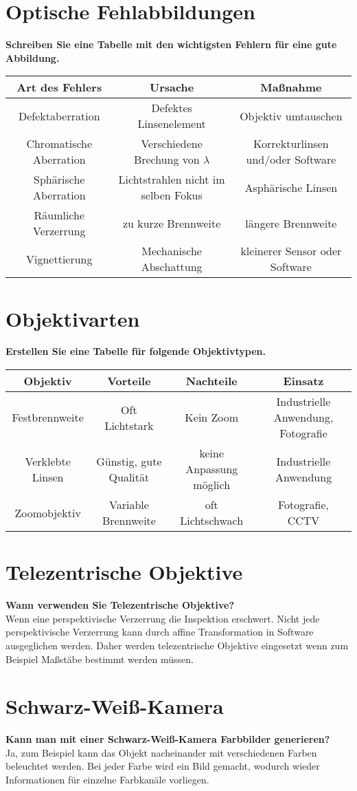 \documentclass[a4paper]{article}
\begin{document}
	\newpage
	
	\section{Optische Fehlabbildungen}
	\textbf{Schreiben Sie eine Tabelle mit den wichtigsten Fehlern für eine gute Abbildung.}\\
		\begin{tabular}{ c|c|c }
			Art des Fehlers & Ursache & Maßnahme \\ 
			\hline
			Defektaberration & Defektes Linsenelement & Objektiv umtauschen \\
			Chromatische Aberration & Verschiedene Brechung von $\lambda$ & Korrekturlinsen und/oder Software\\
			Sphärische Aberration & Lichtstrahlen nicht im selben Fokus & Asphärische Linsen\\
			Räumliche Verzerrung & zu kurze Brennweite & längere Brennweite\\
			Vignettierung & Mechanische Abschattung & kleinerer Sensor oder Software
		\end{tabular}

	
	\section{Objektivarten}
	\textbf{Erstellen Sie eine Tabelle für folgende Objektivtypen.}\\
		\begin{tabular}{ c|c|c|c }
			Objektiv & Vorteile & Nachteile & Einsatz \\ 
			\hline
			Festbrennweite & Oft Lichtstark & Kein Zoom & Industrielle Anwendung, Fotografie\\
			Verklebte Linsen & Günstig, gute Qualität & keine Anpassung möglich & Industrielle Anwendung\\
			Zoomobjektiv & Variable Brennweite & oft Lichtschwach & Fotografie, CCTV
		\end{tabular}
	
	\section{Telezentrische Objektive}
	\textbf{Wann verwenden Sie Telezentrische Objektive?}\\
	Wenn eine perspektivische Verzerrung die Inspektion erschwert. Nicht jede perspektivische Verzerrung kann durch affine Transformation in Software ausgeglichen werden. Daher werden telezentrische Objektive eingesetzt wenn zum Beispiel Maßstäbe bestimmt werden müssen.\\
	
	\section{Schwarz-Weiß-Kamera}
	\textbf{Kann man mit einer Schwarz-Weiß-Kamera Farbbilder generieren?}\\
	Ja, zum Beispiel kann das Objekt nacheinander mit verschiedenen Farben beleuchtet werden. Bei jeder Farbe wird ein Bild gemacht, wodurch wieder Informationen für einzelne Farbkanäle vorliegen.

	
	
\end{document}

